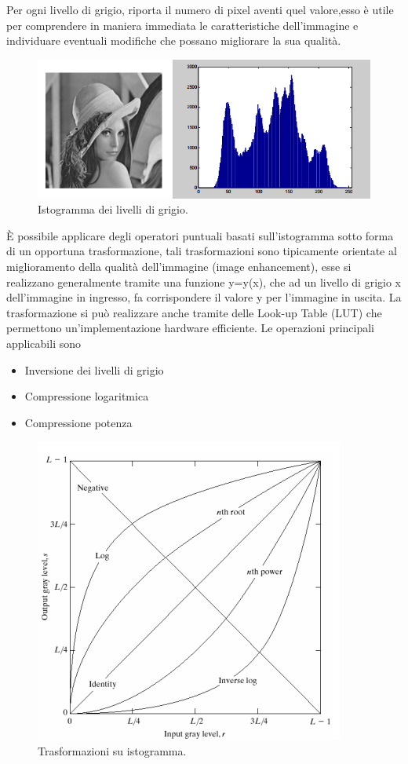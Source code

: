 Per ogni livello di grigio, riporta il numero di pixel 
aventi quel valore,esso è utile per comprendere in maniera 
immediata le caratteristiche dell’immagine e 
individuare eventuali modifiche che possano 
migliorare la sua qualità.
\begin{figure}
\centering
\includegraphics[width=.5\textwidth]{img/histogramma.png}
\caption{Istogramma dei livelli di grigio.}\label{fig:istogramma}
\end{figure}
\`{E} possibile applicare degli operatori puntuali basati sull'istogramma sotto forma di un opportuna trasformazione, tali trasformazioni sono tipicamente orientate al miglioramento della qualità dell’immagine (image
enhancement), esse si realizzano generalmente tramite una funzione 
y=y(x), che ad un livello di grigio x dell’immagine in 
ingresso, fa corrispondere il valore y per l’immagine 
in uscita. La trasformazione si può realizzare anche tramite delle 
Look-up Table (LUT) che permettono 
un’implementazione hardware efficiente.
Le operazioni principali applicabili sono
\begin{itemize}
\item Inversione dei livelli di grigio
\item Compressione logaritmica
\item Compressione potenza
\end{itemize}
\begin{figure}[h]
\centering
\includegraphics[width=.5\textwidth]{img/trasformazione-istogramma.png}
\caption{Trasformazioni su istogramma.}\label{fig:trasformazione-istogramma}
\end{figure}
